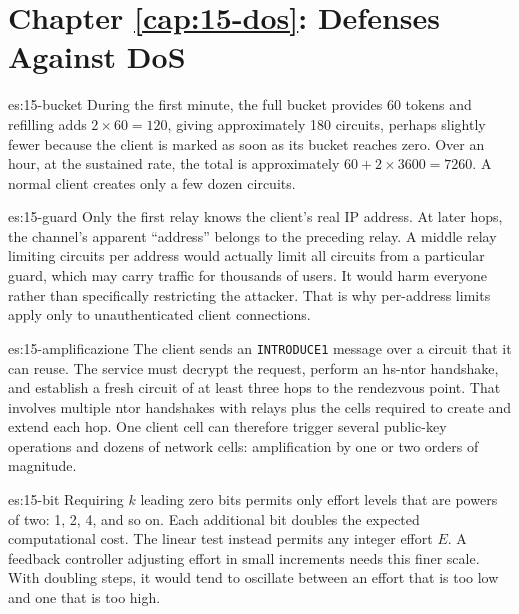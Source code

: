 \section*{Chapter \ref{cap:15-dos}: Defenses Against DoS}

\begin{soluzione}{es:15-bucket}
During the first minute, the full bucket provides 60 tokens and refilling adds $2 \times 60 = 120$, giving approximately 180 circuits, perhaps slightly fewer because the client is marked as soon as its bucket reaches zero. Over an hour, at the sustained rate, the total is approximately $60 + 2 \times 3600 = 7260$. A normal client creates only a few dozen circuits.
\end{soluzione}

\begin{soluzione}{es:15-guard}
Only the first relay knows the client's real IP address. At later hops, the channel's apparent \enquote{address} belongs to the preceding relay. A middle relay limiting circuits per address would actually limit all circuits from a particular guard, which may carry traffic for thousands of users. It would harm everyone rather than specifically restricting the attacker. That is why per-address limits apply only to unauthenticated client connections.
\end{soluzione}

\begin{soluzione}{es:15-amplificazione}
The client sends an \texttt{INTRODUCE1} message over a circuit that it can reuse. The service must decrypt the request, perform an hs-ntor handshake, and establish a fresh circuit of at least three hops to the rendezvous point. That involves multiple ntor handshakes with relays plus the cells required to create and extend each hop. One client cell can therefore trigger several public-key operations and dozens of network cells: amplification by one or two orders of magnitude.
\end{soluzione}

\begin{soluzione}{es:15-bit}
Requiring $k$ leading zero bits permits only effort levels that are powers of two: 1, 2, 4, and so on. Each additional bit doubles the expected computational cost. The linear test instead permits any integer effort $E$. A feedback controller adjusting effort in small increments needs this finer scale. With doubling steps, it would tend to oscillate between an effort that is too low and one that is too high.
\end{soluzione}

